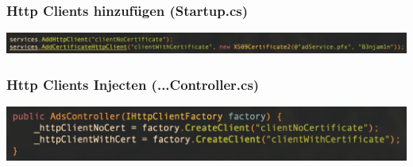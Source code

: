 \documentclass[14pt,a4paper]{extarticle}
\begin{document}
	\subsubsection*{Http Clients hinzufügen (Startup.cs)}
	\begin{center}
		\includegraphics[width=\textwidth]{images/AddHttpClients.png}
	\end{center}

	\subsubsection*{Http Clients Injecten (...Controller.cs)}
	\begin{center}
		\includegraphics[width=\textwidth]{images/InjectClients.png}
	\end{center}
\end{document}

